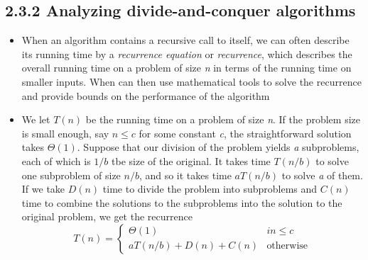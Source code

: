 \documentclass{report}
\begin{document}
\subsection*{2.3.2 Analyzing divide-and-conquer algorithms}
\begin{itemize}
    \item When an algorithm contains a recursive call to itself, we can often describe its running time by a \textit{recurrence equation} or \textit{recurrence}, which describes the overall running time on a problem of size \textit{n} in terms of the running time on smaller inputs. When can then use mathematical tools to solve the recurrence and provide bounds on the performance of the algorithm
    \item We let $T(n)$ be the running time on a problem of size \textit{n}. If the problem size is small enough, say $n \leq c$ for some constant \textit{c}, the straightforward solution takes $\Theta(1)$. Suppose that our division of the problem yields \textit{a} subproblems, each of which is $1/b$ tbe size of the original. It takes time $T(n/b)$ to solve one subproblem of size $n/b$, and so it takes time $aT(n/b)$ to solve \textit{a} of them. If we take $D(n)$ time to divide the problem into subproblems and $C(n)$ time to combine the solutions to the subproblems into the solution to the original problem, we get the recurrence
    \[
        T(n) = 
        \begin{cases}
            \Theta(1) & \textit{i$n\leq c$} \\
            aT(n/b) + D(n) + C(n) & \text{otherwise}
        \end{cases}    
    \]
\end{itemize}
\end{document}
